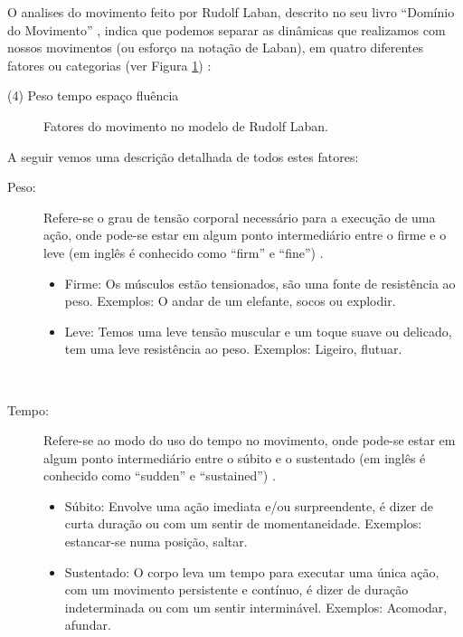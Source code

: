 O  analises do movimento feito por Rudolf Laban, 
descrito no seu livro ``Domínio do Movimento'' \cite[pp. 28]{laban1987dominio},
indica que podemos separar as dinâmicas que realizamos com nossos movimentos
(ou esforço na notação de Laban), 
em quatro diferentes fatores ou categorias (ver Figura \ref{fig:fatores:moviemnto:Laban})
\cite[pp. 142]{laban1987dominio} 
\cite[pp. 93]{maletic2011body}
\cite[pp. 30]{paine2014complete}
\cite[pp. 5]{carline2011lesson}: 
\begin{tasks}(4)
\task Peso
\task tempo 
\task espaço 
\task fluência
\end{tasks}

\begin{figure}
\centering
{} 
\caption{Fatores do movimento no modelo de Rudolf Laban.}
\label{fig:fatores:moviemnto:Laban}
\end{figure}
A seguir vemos uma descrição detalhada de todos estes fatores:\\
\begin{description}
\item[Peso:]
Refere-se o grau de tensão corporal necessário para a execução de uma ação, 
onde pode-se estar em algum ponto intermediário entre o firme e o leve 
(em inglês é conhecido como   ``firm'' e ``fine'') 
\cite[pp. 137, 143]{laban1987dominio}  \cite[pp. 5]{carline2011lesson} \cite[pp. 28]{elementosdanca2017}. 
\begin{itemize}
\item Firme: Os músculos estão tensionados, são uma fonte de resistência ao peso. Exemplos: O andar de um elefante, socos ou explodir.
\item Leve: Temos uma leve tensão muscular e um toque suave ou delicado,
tem uma leve resistência ao peso.  Exemplos: Ligeiro, flutuar.
\end{itemize}~
\end{description}

\begin{description}
\item[Tempo:] Refere-se ao modo do uso do tempo no movimento,
onde pode-se estar em algum ponto intermediário entre o súbito e o sustentado 
(em inglês é conhecido como    ``sudden'' e ``sustained'') 
\cite[pp. 143]{laban1987dominio} \cite[pp. 5]{carline2011lesson} \cite[pp. 28]{elementosdanca2017}.
\begin{itemize}
\item Súbito: Envolve uma ação imediata e/ou surpreendente, é dizer de curta duração
ou com um sentir de momentaneidade. Exemplos: estancar-se numa posição, saltar.
\item Sustentado: O corpo leva um tempo para executar uma única ação, 
com um movimento persistente e contínuo, é dizer de duração indeterminada ou com um sentir interminável.  
Exemplos: Acomodar, afundar.
\end{itemize}~
\end{description}

